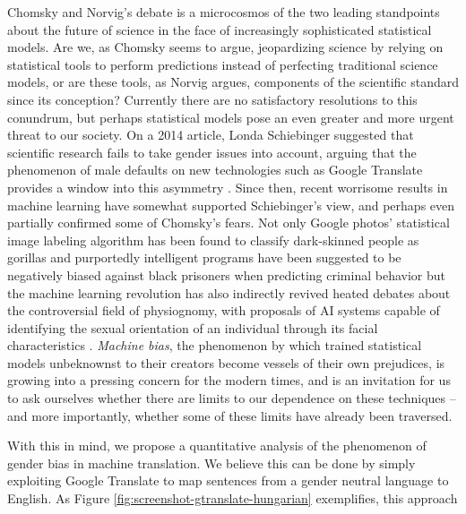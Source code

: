 \documentclass{article}
\begin{document}
Chomsky and Norvig's debate \cite{norvig2017chomsky} is a microcosmos of the two leading standpoints about the future of science in the face of increasingly sophisticated statistical models. Are we, as Chomsky seems to argue, jeopardizing science by relying on statistical tools to perform predictions instead of perfecting traditional science models, or are these tools, as Norvig argues, components of the scientific standard since its conception? Currently there are no satisfactory resolutions to this conundrum, but perhaps statistical models pose an even greater and more urgent threat to our society. On a 2014 article, Londa Schiebinger suggested that scientific research fails to take gender issues into account, arguing that the phenomenon of male defaults on new technologies such as Google Translate provides a window into this asymmetry \cite{schiebinger2014scientific}. Since then, recent worrisome results in machine learning have somewhat supported Schiebinger's view, and perhaps even partially confirmed some of Chomsky's fears. Not only Google photos' statistical image labeling algorithm has been found to classify dark-skinned people as gorillas \cite{garcia2016racist} and purportedly intelligent programs have been suggested to be negatively biased against black prisoners when predicting criminal behavior \cite{angwin2016machine} but the machine learning revolution has also indirectly revived heated debates about the controversial field of physiognomy, with proposals of AI systems capable of identifying the sexual orientation of an individual through its facial characteristics \cite{wang2017deep}. \emph{Machine bias}, the phenomenon by which trained statistical models unbeknownst to their creators become vessels of their own prejudices, is growing into a pressing concern for the modern times, and is an invitation for us to ask ourselves whether there are limits to our dependence on these techniques -- and more importantly, whether some of these limits have already been traversed.

With this in mind, we propose a quantitative analysis of the phenomenon of gender bias in machine translation. We believe this can be done by simply exploiting Google Translate to map sentences from a gender neutral language to English. As Figure \ref{fig:screenshot-gtranslate-hungarian} exemplifies, this approach 
\end{document}

